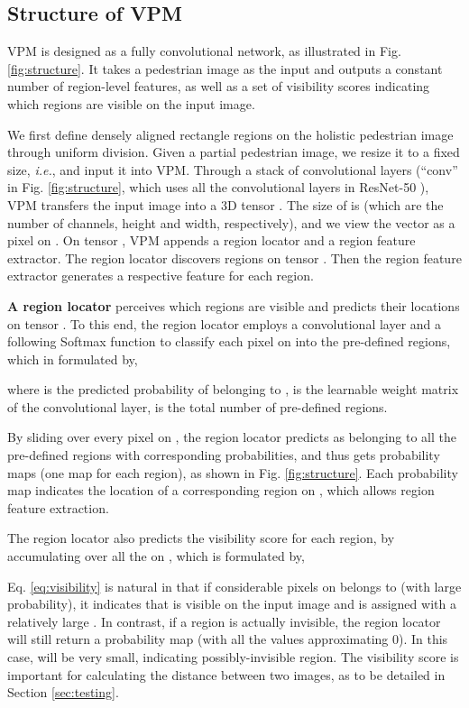 \documentclass[10pt,twocolumn,letterpaper]{article}
\begin{document}
\subsection{Structure of VPM}\label{sec:structure}



VPM is designed as a fully convolutional network, as illustrated in Fig. \ref{fig:structure}. It takes a pedestrian image as the input and outputs a constant number of region-level features, as well as a set of visibility scores indicating which regions are visible on the input image. 

We first define  densely aligned rectangle regions on the holistic pedestrian image through uniform division. Given a partial pedestrian image, we resize it to a fixed size, \emph{i.e.},  and input it into VPM. Through a stack of convolutional layers (``conv'' in Fig. \ref{fig:structure}, which uses all the convolutional layers in ResNet-50 \cite{DBLP:conf/cvpr/HeZRS16}), VPM transfers the input image into a 3D tensor . The size of  is  (which are the number of channels, height and width, respectively), and we view the  vector  as a pixel on . On tensor , VPM appends a region locator and a region feature extractor. The region locator discovers regions on tensor . Then the region feature extractor generates a respective feature for each region.

\textbf{A region locator} perceives which regions are visible and predicts their locations on tensor . To this end, the region locator employs a  convolutional layer and a following Softmax function to classify each pixel  on  into the pre-defined regions, which in formulated by, 

where  is the predicted probability of  belonging to ,  is the learnable weight matrix of the  convolutional layer,  is the total number of pre-defined regions. 



By sliding over every pixel  on , the region locator predicts  as belonging to all the pre-defined regions with corresponding probabilities, and thus gets  probability maps (one  map for each region), as shown in Fig. \ref{fig:structure}. Each probability map indicates the location of a corresponding region on , which allows region feature extraction.  


The region locator also predicts the visibility score  for each region, by accumulating  over all the  on , which is formulated by, 
 
 
 Eq. \ref{eq:visibility} is natural in that if considerable pixels on  belongs to  (with large probability), it indicates that  is visible on the input image and is assigned with a relatively large . In contrast, if a region is actually invisible, the region locator will still return a probability map (with all the values approximating 0). In this case,  will be very small, indicating possibly-invisible region. The visibility score is important for calculating the distance between two images, as to be detailed in Section \ref{sec:testing}.
 
\end{document}
